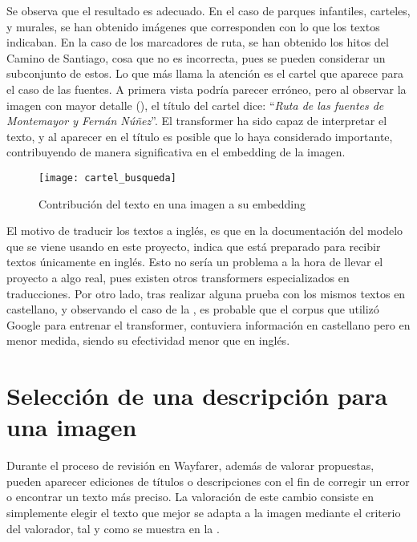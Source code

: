  		Se observa que el resultado es adecuado. En el caso de parques infantiles, carteles, y murales, se han obtenido imágenes que corresponden con lo que los textos indicaban. En la caso de los marcadores de ruta, se han obtenido los hitos del Camino de Santiago, cosa que no es incorrecta, pues se pueden considerar un subconjunto de estos. Lo que más llama la atención es el cartel que aparece para el caso de las fuentes. A primera vista podría parecer erróneo, pero al observar la imagen con mayor detalle (), el título del cartel dice: ``\textit{Ruta de las fuentes de Montemayor y Fernán Núñez}''. El transformer ha sido capaz de interpretar el texto, y al aparecer en el título es posible que lo haya considerado importante, contribuyendo de manera significativa en el embedding de la imagen. \\
 		
 		\begin{figure}[!h]
 			\centering
 			\texttt{[image: cartel\_busqueda]}
 			\caption{Contribución del texto en una imagen a su embedding}
 			\label{fig:texto_embedding}
 		\end{figure} 
 		
 		El motivo de traducir los textos a inglés, es que en la documentación del modelo que se viene usando en este proyecto, indica que está preparado para recibir textos únicamente en inglés. Esto no sería un problema a la hora de llevar el proyecto a algo real, pues existen otros transformers especializados en traducciones. Por otro lado, tras realizar alguna prueba con los mismos textos en castellano, y observando el caso de la , es probable que el corpus que utilizó Google para entrenar el transformer, contuviera información en castellano pero en menor medida, siendo su efectividad menor que en inglés. 
 		
	\section{Selección de una descripción para una imagen}
	
		Durante el proceso de revisión en Wayfarer, además de valorar propuestas, pueden aparecer ediciones de títulos o descripciones con el fin de corregir un error o encontrar un texto más preciso. La valoración de este cambio consiste en simplemente elegir el texto que mejor se adapta a la imagen mediante el criterio del valorador, tal y como se muestra en la . \\
		
